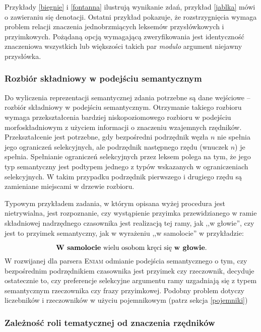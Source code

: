 \documentclass[a4paper, 12pt]{article}
\theoremstyle{remark}
\newcommand{\eniam}{\textsc{Eniam}}
\begin{document}
Przykłady \ref{biegnie} i \ref{fontanna} ilustrują wynikanie zdań, przykład \ref{jablka} mówi o zawieraniu się denotacji.
Ostatni przykład pokazuje, że rozstrzygnięcia wymaga problem relacji znaczenia jednobrzmiących leksemów przysłówkowych i przyimkowych. Pożądaną opcją wymagającą zweryfikowania jest identyczność znaczeniowa wszystkich lub większości takich par \emph{modulo} argument niejawny przysłówka.

\subsubsection{Rozbiór składniowy w podejściu semantycznym}

Do wyliczenia reprezentacji semantycznej zdania potrzebne są dane wejściowe -- rozbiór składniowy w podejściu semantycznym. Otrzymanie takiego rozbioru wymaga przekształcenia bardziej niskopoziomowego rozbioru w podejściu morfoskładniowym z użyciem informacji o znaczeniu wzajemnych rzędników. Przekształcenie jest potrzebne, gdy bezpośredni podrzędnik węzła $n$ nie spełnia jego ograniczeń selekcyjnych, ale podrzędnik następnego rzędu (wnuczek $n$) je spełnia. Spełnianie ograniczeń selekcyjnych przez leksem polega na tym, że jego typ semantyczny jest podtypem jednego z typów wskazanych w ograniczeniach selekcyjnych. W takim przypadku podrzędnik pierwszego i drugiego rzędu są zamieniane miejscami w drzewie rozbioru.

Typowym przykładem zadania, w którym opisana wyżej procedura jest nietrywialna, jest rozpoznanie, czy wystąpienie przyimka przewidzianego w ramie składniowej nadrzędnego czasownika jest realizacją tej ramy, jak ,,w głowie'', czy jest to przyimek semantyczny, jak w wyrażeniu ,,w samolocie'' w przykładzie:

\begin{equation}
	\text{\textbf{W samolocie} wielu osobom kręci się \textbf{w głowie}.}
\end{equation}
W rozwijanej dla parsera \eniam{} odmianie podejścia semantycznego
o tym, czy bezpośrednim podrzędnikiem czasownika jest przyimek czy rzeczownik,
decyduje ostatecznie to, czy preferencje selekcyjne argumentu ramy uzgadniają się z typem semantycznym rzeczownika czy frazy przyimkowej.
Podobny problem dotyczy liczebników i rzeczowników w użyciu pojemnikowym (patrz sekcja \ref{pojemniki})

\subsubsection{Zależność roli tematycznej od znaczenia rzędników}
\end{document}
